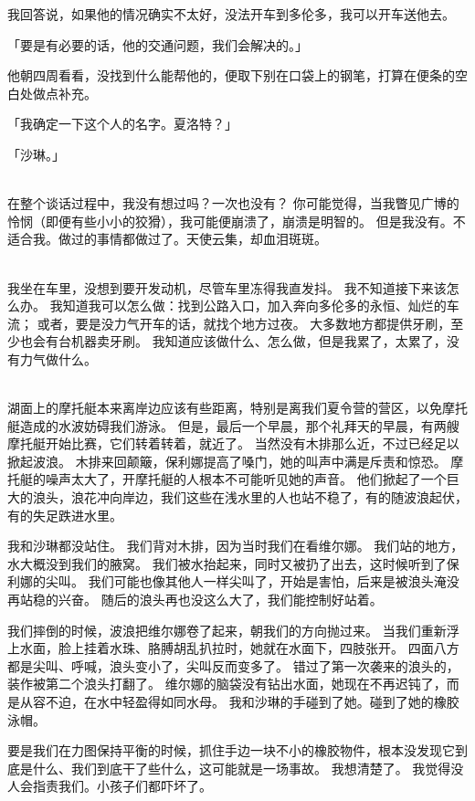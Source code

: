 \documentclass[UTF8]{ctexart}
\begin{document}
我回答说，如果他的情况确实不太好，没法开车到多伦多，我可以开车送他去。

「要是有必要的话，他的交通问题，我们会解决的。」

他朝四周看看，没找到什么能帮他的，便取下别在口袋上的钢笔，打算在便条的空白处做点补充。

「我确定一下这个人的名字。夏洛特？」

「沙琳。」

~\\

在整个谈话过程中，我没有想过吗？一次也没有？
你可能觉得，当我瞥见广博的怜悯（即便有些小小的狡猾），我可能便崩溃了，崩溃是明智的。
但是我没有。不适合我。做过的事情都做过了。天使云集，却血泪斑斑。

~\\

我坐在车里，没想到要开发动机，尽管车里冻得我直发抖。
我不知道接下来该怎么办。
我知道我可以怎么做：找到公路入口，加入奔向多伦多的永恒、灿烂的车流；
或者，要是没力气开车的话，就找个地方过夜。
大多数地方都提供牙刷，至少也会有台机器卖牙刷。
我知道应该做什么、怎么做，但是我累了，太累了，没有力气做什么。

~\\

湖面上的摩托艇本来离岸边应该有些距离，特别是离我们夏令营的营区，以免摩托艇造成的水波妨碍我们游泳。
但是，最后一个早晨，那个礼拜天的早晨，有两艘摩托艇开始比赛，它们转着转着，就近了。
当然没有木排那么近，不过已经足以掀起波浪。
木排来回颠簸，保利娜提高了嗓门，她的叫声中满是斥责和惊恐。
摩托艇的噪声太大了，开摩托艇的人根本不可能听见她的声音。
他们掀起了一个巨大的浪头，浪花冲向岸边，我们这些在浅水里的人也站不稳了，有的随波浪起伏，有的失足跌进水里。

我和沙琳都没站住。
我们背对木排，因为当时我们在看维尔娜。
我们站的地方，水大概没到我们的腋窝。
我们被水抬起来，同时又被扔了出去，这时候听到了保利娜的尖叫。
我们可能也像其他人一样尖叫了，开始是害怕，后来是被浪头淹没再站稳的兴奋。
随后的浪头再也没这么大了，我们能控制好站着。

我们摔倒的时候，波浪把维尔娜卷了起来，朝我们的方向抛过来。
当我们重新浮上水面，脸上挂着水珠、胳膊胡乱扒拉时，她就在水面下，四肢张开。
四面八方都是尖叫、呼喊，浪头变小了，尖叫反而变多了。
错过了第一次袭来的浪头的，装作被第二个浪头打翻了。
维尔娜的脑袋没有钻出水面，她现在不再迟钝了，而是从容不迫，在水中轻盈得如同水母。
我和沙琳的手碰到了她。碰到了她的橡胶泳帽。

要是我们在力图保持平衡的时候，抓住手边一块不小的橡胶物件，根本没发现它到底是什么、我们到底干了些什么，这可能就是一场事故。
我想清楚了。
我觉得没人会指责我们。小孩子们都吓坏了。
\end{document}

